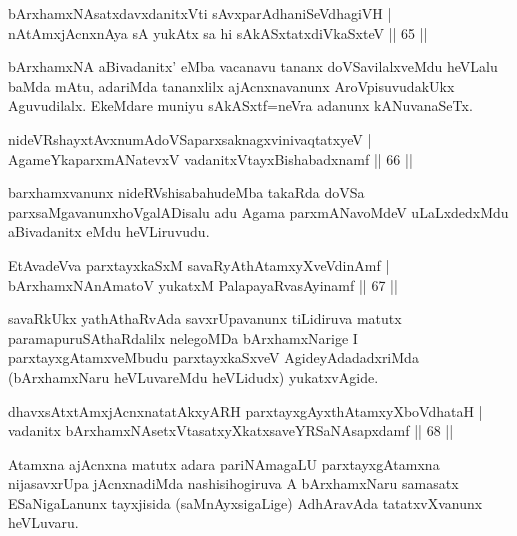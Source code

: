 \begin{shl}
bArxhamxNAsatxdavxdanitxVti sAvxparAdhaniSeVdhagiVH |\\
nA\s \s tAmxjAcnxnAya sA yukAtx sa hi sAkASxtatxdiVkaSxteV \hfill || 65 ||
\end{shl}

\begin{artha}
bArxhamxNA aBivadanitx' eMba vacanavu tananx doVSavilalxveMdu heVLalu baMda mAtu, adariMda tananxlilx ajAcnxnavanunx AroVpisuvudakUkx Aguvudilalx. EkeMdare muniyu sAkASxtf=neVra adanunx kANuvanaSeTx.
\end{artha}


\begin{shl}
nideVRshayxtAvxnumAdoVSaparxsaknagxvinivaqtatxyeV |\\
AgameYkaparxmANatevxV vadanitxVtayxBishabadxnamf \hfill || 66 ||
\end{shl}

\begin{artha}
barxhamxvanunx nideRVshisabahudeMba takaRda doVSa parxsaMgavanunx\break hoVgalADisalu adu Agama parxmANavoMdeV uLaLxdedxMdu aBivadanitx eMdu heVLiruvudu.
\end{artha}

\begin{shl}
EtAvadeVva parxtayxkaSxM savaRyAthAtamxyXveVdinAmf |\\
bArxhamxNAnAmatoV yukatxM PalapayaRvasAyinamf \hfill || 67 ||
\end{shl}

\begin{artha}
savaRkUkx yathAthaRvAda savxrUpavanunx tiLidiruva matutx paramapuruSAthaRdalilx nelegoMDa bArxhamxNarige I parxtayxgAtamxveMbudu parxtayxkaSxveV AgideyAdadadxriMda (bArxhamxNaru heVLuvareMdu heVLidudx) yukatxvAgide.
\end{artha}

\begin{shl}
dhavxsAtxtAmxjAcnxnatatAkxyARH parxtayxgAyxthAtamxyXboVdhataH |\\
vadanitx bArxhamxNAsetxV\s tasatxyXkatxsaveYRSaNAsapxdamf \hfill || 68 ||
\end{shl}

\begin{artha}
Atamxna ajAcnxna matutx adara pariNAmagaLU parxtayxgAtamxna nijasavxrUpa jAcnxnadiMda nashisihogiruva A bArxhamxNaru samasatx ESaNigaLanunx tayxjisida (saMnAyxsigaLige) AdhAravAda tatatxvXvanunx heVLuvaru.
\end{artha}

